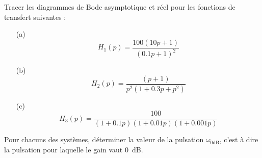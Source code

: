 \question{}
Tracer les diagrammes de Bode asymptotique et réel pour les fonctions de transfert suivantes :
\begin{itemize}
    \item[(a)]
\[
    H_1(p)=\dfrac{100(10p+1)}{(0.1p+1)^2}
\]
    \item[(b)]
\[
    H_2(p)=\dfrac{(p+1)}{p^2(1+0.3p+p^2)} 
\]
    \item[(c)]
\[
    H_3(p)=\dfrac{100}{(1+0.1p)(1+0.01p)(1+0.001p)}
\]
\end{itemize}
\question{}
Pour chacuns des systèmes, déterminer la valeur de la pulsation $\omega_{0\si{\dB}}$, 
c'est à dire la pulsation pour laquelle le gain vaut 0~\si{\dB}.
